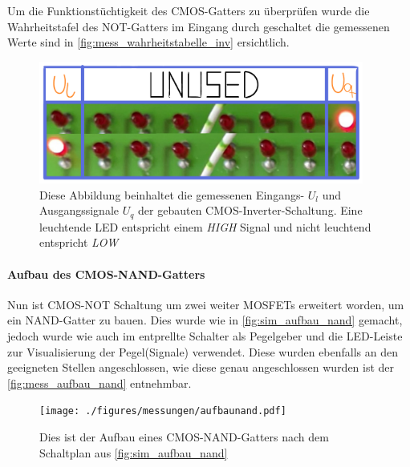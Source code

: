 \documentclass[12pt,english,ngerman]{scrartcl}
\begin{document}
Um die Funktionstüchtigkeit des CMOS-Gatters zu überprüfen wurde die
Wahrheitstafel des NOT-Gatters im Eingang durch geschaltet die gemessenen Werte
sind in \autoref{fig:mess_wahrheitstabelle_inv} ersichtlich.

\begin{figure}[H]
  \centering
    \includegraphics[width=0.95\textwidth]{./figures/messungen/WahrheitstabelleInverter.pdf}
  \caption{Diese Abbildung beinhaltet die gemessenen Eingangs- $U_l$ und
  Ausgangssignale $U_q$ der gebauten CMOS-Inverter-Schaltung. Eine leuchtende
  LED entspricht einem \textit{HIGH} Signal und nicht leuchtend entspricht
  \textit{LOW}} 
\label{fig:mess_wahrheitstabelle_inv}
\end{figure}


\paragraph{Aufbau des CMOS-NAND-Gatters}
Nun ist CMOS-NOT Schaltung um zwei weiter MOSFETs erweitert worden, um ein
NAND-Gatter zu bauen. Dies wurde wie in \autoref{fig:sim_aufbau_nand} gemacht,
jedoch wurde wie auch im  entprellte Schalter als
Pegelgeber und die LED-Leiste zur Visualisierung der Pegel(Signale) verwendet.
Diese wurden ebenfalls an den geeigneten Stellen angeschlossen, wie diese genau
angeschlossen wurden ist der \autoref{fig:mess_aufbau_nand} entnehmbar.

\begin{figure}[H]
  \centering
    \texttt{[image: ./figures/messungen/aufbaunand.pdf]}
  \caption{Dies ist der Aufbau eines CMOS-NAND-Gatters nach dem Schaltplan aus \autoref{fig:sim_aufbau_nand}}
  \label{fig:mess_aufbau_nand}
\end{figure}
\end{document}
